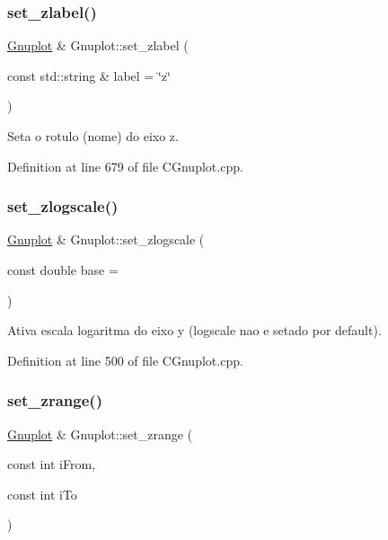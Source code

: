 \subsubsection{\texorpdfstring{set\+\_\+zlabel()}{set\_zlabel()}}
{\footnotesize\ttfamily \hyperlink{class_gnuplot}{Gnuplot} \& Gnuplot\+::set\+\_\+zlabel (\begin{DoxyParamCaption}\item[{const std\+::string \&}]{label = {\ttfamily \char`\"{}z\char`\"{}} }\end{DoxyParamCaption})}



Seta o rotulo (nome) do eixo z. 



Definition at line 679 of file C\+Gnuplot.\+cpp.

\mbox{\label{class_gnuplot_a1da3838163b0dbde8809b55c5b5c56b1}} 
\subsubsection{\texorpdfstring{set\+\_\+zlogscale()}{set\_zlogscale()}}
{\footnotesize\ttfamily \hyperlink{class_gnuplot}{Gnuplot} \& Gnuplot\+::set\+\_\+zlogscale (\begin{DoxyParamCaption}\item[{const double}]{base = {} }\end{DoxyParamCaption})}



Ativa escala logaritma do eixo y (logscale nao e setado por default). 



Definition at line 500 of file C\+Gnuplot.\+cpp.

\mbox{\label{class_gnuplot_a91666451b8cfd1c5b279d2e585b11af6}} 
\subsubsection{\texorpdfstring{set\+\_\+zrange()}{set\_zrange()}}
{\footnotesize\ttfamily \hyperlink{class_gnuplot}{Gnuplot} \& Gnuplot\+::set\+\_\+zrange (\begin{DoxyParamCaption}\item[{const int}]{i\+From,  }\item[{const int}]{i\+To }\end{DoxyParamCaption})}



